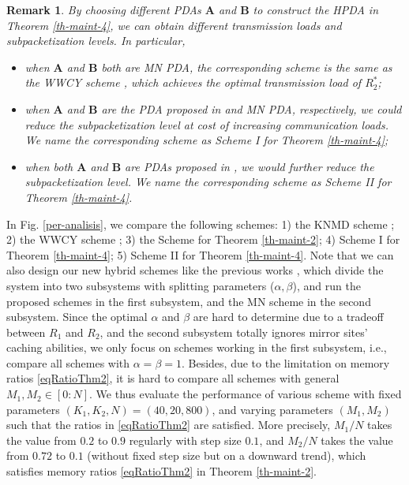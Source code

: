 \documentclass[onecolumn,10pt]{IEEEtran}
\theoremstyle{mythm}
\newtheorem{remark}{Remark}
\begin{document}
\begin{remark}\label{remark-3} By choosing different PDAs $\mathbf{A}$ and $\mathbf{B}$ to construct the HPDA in Theorem \ref{th-maint-4}, we can obtain different transmission loads and subpacketization levels. In particular,
\begin{itemize}
\item
when $\mathbf{A}$ and $\mathbf{B}$ both are   MN PDA, the corresponding scheme is the same as the WWCY scheme \cite{WWCY}, which achieves the optimal transmission load of $R^*_2$;
\item when    $\mathbf{A}$ and $\mathbf{B}$  are the PDA proposed in \cite{YCTC} and   MN PDA,  respectively,  we could reduce the subpacketization level at cost of   increasing communication loads. We name the corresponding scheme as Scheme I for Theorem \ref{th-maint-4};
\item when  both $\mathbf{A}$ and $\mathbf{B}$  are   PDAs proposed in \cite{YCTC},  we would further reduce the  subpacketization level. We name the corresponding scheme as Scheme II for Theorem \ref{th-maint-4}.
\end{itemize}
\end{remark}


In Fig. \ref{per-analisis}, we compare the following schemes: 1) the KNMD scheme  \cite{KNMD}; 2) the  WWCY scheme  \cite{WWCY}; 3) the Scheme for Theorem \ref{th-maint-2};  4) Scheme I for Theorem \ref{th-maint-4}; 5)  Scheme II for Theorem \ref{th-maint-4}.  Note that we can also design our new hybrid schemes  like  the previous works \cite{KNMD,WWCY}, which  divide the system into two subsystems  with splitting parameters ($\alpha, \beta$), and run  the proposed schemes in the first subsystem, and the MN  scheme in the second subsystem. Since the optimal $\alpha$ and $\beta$ are hard to determine due to a tradeoff between $R_1$ and $R_2$, and  the second subsystem  totally ignores mirror sites'  caching abilities, we only focus on    schemes working in the first subsystem, i.e., compare all schemes with  $\alpha=\beta=1$. Besides, due to  the  limitation on memory ratios \eqref{eqRatioThm2}, it is hard to compare all schemes with   general $M_1,M_2\in[0:N]$.  We thus evaluate the performance of various scheme with fixed parameters $(K_1,K_2,N)=(40,20,800)$, and varying
parameters $(M_1,M_2)$ such that the ratios in \eqref{eqRatioThm2} are satisfied.
 More precisely, $M_1/N$ takes the value from $0.2$ to $0.9$ regularly with step size $0.1$, and $M_2/N$ takes the value from $0.72$ to $0.1$ (without fixed step size but on a downward trend), which satisfies  memory ratios \eqref{eqRatioThm2} in Theorem \ref{th-maint-2}.
\end{document}
